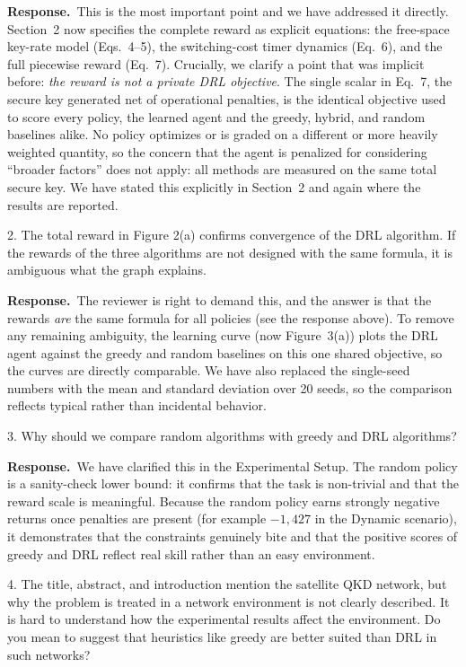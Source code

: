 \documentclass[11pt]{article}
\newcommand{\resp}{\par\smallskip\noindent\textbf{Response.}\ }
\begin{document}
\resp This is the most important point and we have addressed it directly. Section~2
now specifies the complete reward as explicit equations: the free-space key-rate
model (Eqs.~4--5), the switching-cost timer dynamics (Eq.~6), and the full piecewise
reward (Eq.~7). Crucially, we clarify a point that was implicit before: \emph{the
reward is not a private DRL objective}. The single scalar in Eq.~7, the secure key
generated net of operational penalties, is the identical objective used to score
every policy, the learned agent and the greedy, hybrid, and random baselines alike.
No policy optimizes or is graded on a different or more heavily weighted quantity, so
the concern that the agent is penalized for considering ``broader factors'' does not
apply: all methods are measured on the same total secure key. We have stated this
explicitly in Section~2 and again where the results are reported.

\begin{rc}
2. The total reward in Figure 2(a) confirms convergence of the DRL algorithm. If the
rewards of the three algorithms are not designed with the same formula, it is
ambiguous what the graph explains.
\end{rc}

\resp The reviewer is right to demand this, and the answer is that the rewards
\emph{are} the same formula for all policies (see the response above). To remove any
remaining ambiguity, the learning curve (now Figure~3(a)) plots the DRL agent
against the greedy and random baselines on this one shared objective, so the curves
are directly comparable. We have also replaced the single-seed numbers with the mean
and standard deviation over 20 seeds, so the comparison reflects typical rather than
incidental behavior.

\begin{rc}
3. Why should we compare random algorithms with greedy and DRL algorithms?
\end{rc}

\resp We have clarified this in the Experimental Setup. The random policy is a
sanity-check lower bound: it confirms that the task is non-trivial and that the
reward scale is meaningful. Because the random policy earns strongly negative
returns once penalties are present (for example $-1{,}427$ in the Dynamic scenario),
it demonstrates that the constraints genuinely bite and that the positive scores of
greedy and DRL reflect real skill rather than an easy environment.

\begin{rc}
4. The title, abstract, and introduction mention the satellite QKD network, but why
the problem is treated in a network environment is not clearly described. It is hard
to understand how the experimental results affect the environment. Do you mean to
suggest that heuristics like greedy are better suited than DRL in such networks?
\end{rc}
\end{document}
